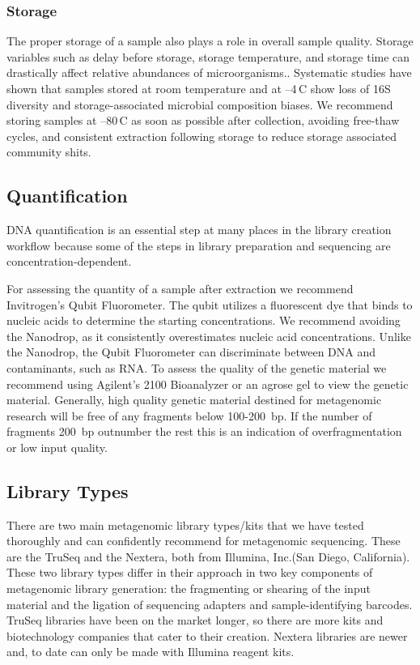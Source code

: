 \documentclass[graybox]{svmult}
\begin{document}
\subsubsection{Storage}
The proper storage of a sample also plays a role in overall sample quality.  Storage variables such as delay before storage, storage temperature, and storage time can drastically affect relative abundances of microorganisms.. Systematic studies have shown that samples stored at room temperature and at --4\degree\,C show loss of 16S diversity and storage-associated microbial composition biases\cite{Rubin2013Investigating}.  We recommend storing samples at --80\degree\,C as soon as possible after collection, avoiding free-thaw cycles, and consistent extraction following storage to reduce storage associated community shits.  

\subsection{Quantification}
DNA quantification is an essential step at many places in the library creation workflow because some of the steps in library preparation and sequencing are concentration-dependent.

For assessing the quantity of a sample after extraction we recommend Invitrogen’s Qubit Fluorometer. The qubit utilizes a fluorescent dye that binds to nucleic acids to determine the starting concentrations.  We recommend avoiding the Nanodrop, as it consistently overestimates nucleic acid concentrations. Unlike the Nanodrop, the Qubit Fluorometer can discriminate between DNA and contaminants, such as RNA.
%
To assess the quality of the genetic material we recommend using Agilent’s 2100 Bioanalyzer or an agrose gel to view the genetic material. Generally, high quality genetic material destined for metagenomic research will be free of any fragments below 100-200~bp.  If the number of fragments 200~bp outnumber the rest this is an indication of overfragmentation or low input quality.

\subsection{Library Types}
There are two main metagenomic library types/kits that we have tested thoroughly and can confidently recommend for metagenomic sequencing.  These are the TruSeq and the Nextera, both from Illumina, Inc.(San Diego, California). These two library types differ in their approach in two key components of metagenomic library generation: the fragmenting or shearing of the input material and the ligation of sequencing adapters and sample-identifying barcodes.  TruSeq libraries have been on the market longer, so there are more kits and biotechnology companies that cater to their creation. 
Nextera libraries are newer and, to date can only be made with Illumina reagent kits. 
 
\end{document}
